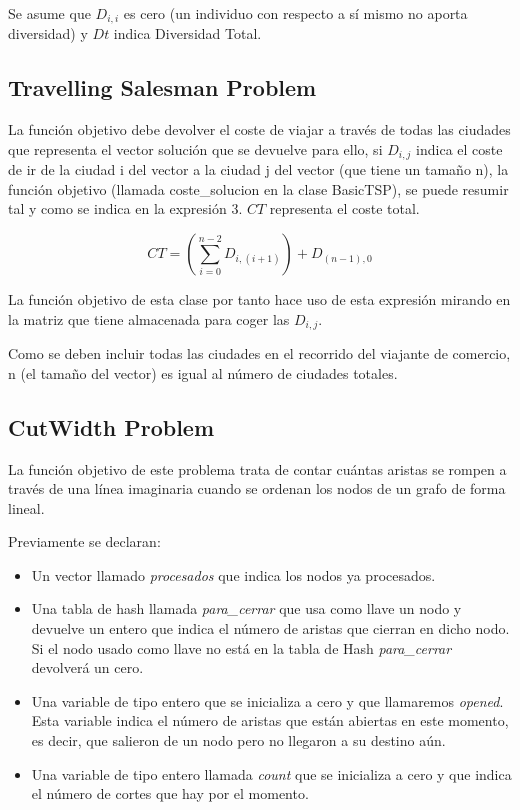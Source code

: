 \documentclass[12pt,a4paper,draft,openany]{article}
\begin{document}
Se asume que $D_{i,i}$ es cero (un individuo con respecto a sí mismo no aporta diversidad) y $Dt$ indica Diversidad Total.

\subsection{Travelling Salesman Problem}
La función objetivo debe devolver el coste de viajar a través de todas las ciudades que representa el vector solución que se devuelve para ello, si $D_{i,j}$ indica el coste de ir de la ciudad i del vector a la ciudad j del vector (que tiene un tamaño n), la función objetivo (llamada coste\_solucion en la clase BasicTSP), se puede resumir tal y como se indica en la expresión 3. $CT$ representa el coste total.

\begin{equation}
CT = (\sum_{i = 0}^{n-2} D_{i,(i+1)}) + D_{(n-1),0}
\end{equation}

La función objetivo de esta clase por tanto hace uso de esta expresión mirando en la matriz que tiene almacenada para coger las $D_{i,j}$.

Como se deben incluir todas las ciudades en el recorrido del viajante de comercio, n (el tamaño del vector) es igual al número de ciudades totales.

\subsection{CutWidth Problem}
La función objetivo de este problema trata de contar cuántas aristas se rompen a través de una
línea imaginaria cuando se ordenan los nodos de un grafo de forma lineal. 

Previamente se declaran:
\begin{itemize}
\item Un vector llamado \emph{procesados} que indica los nodos ya procesados.
\item Una tabla de hash llamada \emph{para\_cerrar} que usa como llave un nodo y devuelve un entero que indica el número de aristas que cierran en dicho nodo. Si el nodo usado como llave no está en la tabla de Hash \emph{para\_cerrar} devolverá un cero.
\item Una variable de tipo entero que se inicializa a cero y que llamaremos \emph{opened}. Esta variable indica el número de aristas que están abiertas en este momento, es decir, que salieron de un nodo pero no llegaron a su destino aún.
\item Una variable de tipo entero llamada \emph{count} que se inicializa a cero y que indica el número de cortes que hay por el momento.
\end{itemize}
\end{document}
